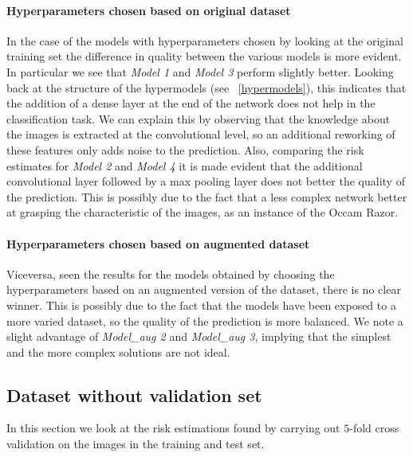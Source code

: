 \paragraph{Hyperparameters chosen based on original dataset}
In the case of the models with hyperparameters chosen by looking at the original training set the difference in quality between the various models is more evident. In particular we see that \textsl{Model 1} and \textsl{Model 3} perform slightly better. Looking back at the structure of the hypermodels (see ~\ref{hypermodels}), this indicates that the addition of a dense layer at the end of the network does not help in the classification task. We can explain this by observing that the knowledge about the images is extracted at the convolutional level, so an additional reworking of these features only adds noise to the prediction.
Also, comparing the risk estimates for \textsl{Model 2} and \textsl{Model 4} it is made evident that the additional convolutional layer followed by a max pooling layer does not better the quality of the prediction. This is possibly due to the fact that a less complex network better at grasping the characteristic of the images, as an instance of the Occam Razor.

\paragraph{Hyperparameters chosen based on augmented dataset}
Viceversa, seen the results for the models obtained by choosing the hyperparameters based on an augmented version of the dataset, there is no clear winner. This is possibly due to the fact that the models have been exposed to a more varied dataset, so the quality of the prediction is more balanced. We note a slight advantage of \textsl{Model\_aug 2} and \textsl{Model\_aug 3}, implying that the simplest and the more complex solutions are not ideal.


\subsection{Dataset without validation set}
In this section we look at the risk estimations found by carrying out $5$-fold cross validation on the images in the training and test set. 